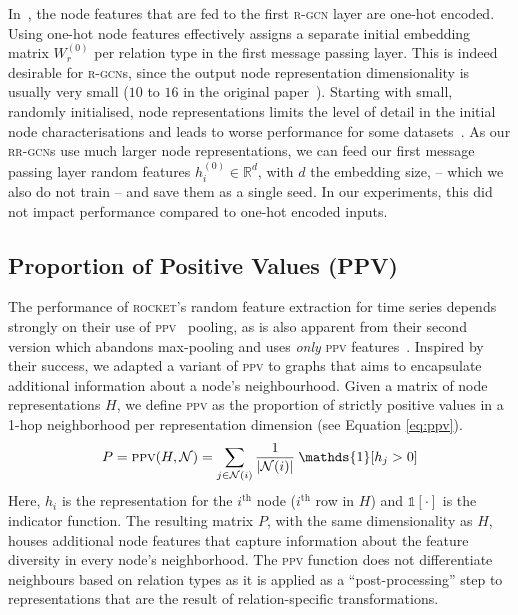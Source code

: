 \documentclass{llncs}
\begin{document}
In~\cite{schlichtkrull2018modeling}, the node features that are fed to the first \textsc{r-gcn} layer are one-hot encoded. Using one-hot node features effectively assigns a separate initial embedding matrix $W^{(0)}_r$ per relation type in the first message passing layer. This is indeed desirable for \textsc{r-gcn}s, since the output node representation dimensionality is usually very small ($10$ to $16$ in the original paper~\cite{schlichtkrull2018modeling}). Starting with small, randomly initialised, node representations limits the level of detail in the initial node characterisations and leads to worse performance for some datasets~\cite{thanapalasingam2021relational}. 
As our \textsc{rr-gcn}s use much larger node representations, we can feed our first message passing layer random features $h^{(0)}_{i} \in \mathbb{R}^{d}$, with $d$ the embedding size, -- which we also do not train -- and save them as a single seed. In our experiments, this did not impact performance compared to one-hot encoded inputs.

\subsection{Proportion of Positive Values (PPV)} \label{subsec:ppv}
The performance of \textsc{rocket}'s random feature extraction for time series depends strongly on their use of \textsc{ppv}~\cite{dempster2020rocket} pooling, as is also apparent from their second version which abandons max-pooling and uses \textit{only} \textsc{ppv} features~\cite{dempster2021minirocket}. Inspired by their success, we adapted a variant of \textsc{ppv} to graphs that aims to encapsulate additional information about a node's neighbourhood. Given a matrix of node representations $H$, we define \textsc{ppv} as the proportion of strictly positive values in a 1-hop neighborhood per representation dimension (see Equation \ref{eq:ppv}).
\begin{equation}
    \label{eq:ppv}
    P = \textsc{ppv}(H, \mathcal{N}) = \sum\limits_{j \in \mathcal{N}(i)} \frac{1}{|\mathcal{N}(i)|} \: \mathds{1}[h_j > 0]
\end{equation}
Here, $h_i$ is the representation for the $i^{\text{th}}$ node ($i^{\text{th}}$ row in $H$) and $\mathds{1}[\cdot]$ is the indicator function. The resulting matrix $P$, with the same dimensionality as $H$, houses additional node features that capture information about the feature diversity in every node's neighborhood.
The \textsc{ppv} function does not differentiate neighbours based on relation types as it is applied as a ``post-processing'' step to representations that are the result of relation-specific transformations.
\end{document}
